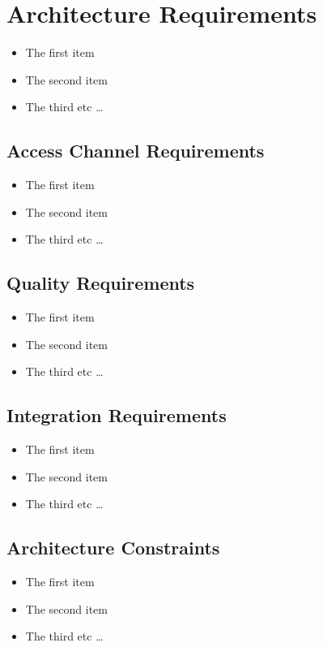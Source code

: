 \documentclass{article}
\begin{document}
	\cleardoublepage
	\section{Architecture Requirements}\label{sec:architecture}
		\begin{itemize}
		  \item The first item
		  \item The second item
		  \item The third etc \ldots
		\end{itemize}
		
		\subsection{Access Channel Requirements}\label{subsec:access}
			\begin{itemize}
			  \item The first item
			  \item The second item
			  \item The third etc \ldots
			\end{itemize}
		
		\subsection{Quality Requirements}\label{subsec:quality}
			\begin{itemize}
			  \item The first item
			  \item The second item
			  \item The third etc \ldots
			\end{itemize}
		
		\subsection{Integration Requirements}\label{subsec:integration}
			\begin{itemize}
			  \item The first item
			  \item The second item
			  \item The third etc \ldots
			\end{itemize}
		
		\subsection{Architecture Constraints}\label{subsec:constraints}
			\begin{itemize}
			  \item The first item
			  \item The second item
			  \item The third etc \ldots
			\end{itemize}
		
\end{document}
